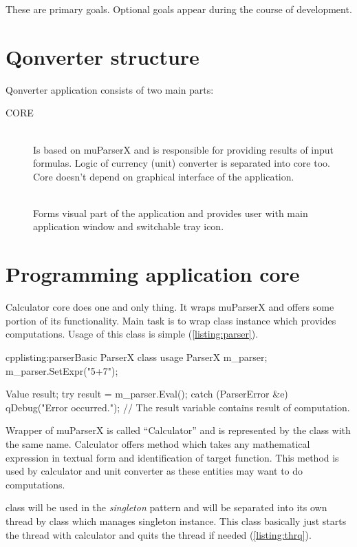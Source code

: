 These are primary goals. Optional goals appear during the course of development.

\section{Qonverter structure}
Qonverter application consists of two main parts:
\begin{description}
\item[CORE] \hfill \\
Is based on muParserX and is responsible for providing results of input formulas. Logic of currency (unit) converter is separated into core too. Core doesn't depend on graphical interface of the application.
\item[] \hfill \\
Forms visual part of the application and provides user with main application window and switchable tray icon.
\end{description}

\section{Programming application core}
Calculator core does one and only thing. It wraps muParserX and offers some portion of its functionality. Main task is to wrap class instance which provides computations. Usage of this class is simple (\autoref{listing:parser}).

\begin{fdoccode}{cpp}{listing:parser}{Basic ParserX class usage}
ParserX m_parser;
m_parser.SetExpr("5+7");

Value result;
try {
	result = m_parser.Eval();
}
catch (ParserError &e) {
	qDebug("Error occurred.");
}
// The result variable contains result of computation.
\end{fdoccode}

Wrapper of muParserX is called \enquote{Calculator} and is represented by the class with the same name. Calculator offers method which takes any mathematical expression in textual form and identification of target function. This method is used by calculator and unit converter as these entities may want to do computations.

\indent {} class will be used in the \textit{singleton} pattern and will be separated into its own thread by class which manages singleton instance. This class basically just starts the thread with calculator and quits the thread if needed (\autoref{listing:thrq}).

